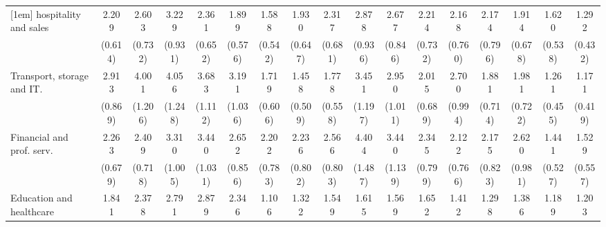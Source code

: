 {\begin{tabular}{l*{16}{c}}
[1em]
hospitality and sales&       2.209\sym{**} &       2.603\sym{***}&       3.229\sym{***}&       2.361\sym{**} &       1.899\sym{*}  &       1.588         &       1.930         &       2.317\sym{**} &       2.878\sym{**} &       2.677\sym{**} &       2.214\sym{*}  &       2.168\sym{*}  &       2.174\sym{*}  &       1.914         &       1.620         &       1.292         \\
                    &     (0.614)         &     (0.732)         &     (0.931)         &     (0.652)         &     (0.576)         &     (0.542)         &     (0.647)         &     (0.681)         &     (0.936)         &     (0.846)         &     (0.732)         &     (0.760)         &     (0.796)         &     (0.678)         &     (0.538)         &     (0.432)         \\
[1em]
Transport, storage and IT.&       2.913\sym{***}&       4.001\sym{***}&       4.056\sym{***}&       3.683\sym{***}&       3.191\sym{***}&       1.719         &       1.458         &       1.778         &       3.451\sym{***}&       2.950\sym{**} &       2.015\sym{*}  &       2.700\sym{**} &       1.881         &       1.981         &       1.261         &       1.171         \\
                    &     (0.869)         &     (1.206)         &     (1.248)         &     (1.112)         &     (1.036)         &     (0.606)         &     (0.509)         &     (0.558)         &     (1.197)         &     (1.011)         &     (0.689)         &     (0.994)         &     (0.714)         &     (0.722)         &     (0.455)         &     (0.419)         \\
[1em]
Financial and prof. serv.&       2.263\sym{**} &       2.409\sym{**} &       3.310\sym{***}&       3.440\sym{***}&       2.652\sym{**} &       2.202\sym{*}  &       2.236\sym{*}  &       2.566\sym{**} &       4.404\sym{***}&       3.440\sym{***}&       2.345\sym{*}  &       2.122\sym{*}  &       2.175\sym{*}  &       2.620\sym{*}  &       1.441         &       1.529         \\
                    &     (0.679)         &     (0.718)         &     (1.005)         &     (1.031)         &     (0.856)         &     (0.783)         &     (0.802)         &     (0.803)         &     (1.487)         &     (1.139)         &     (0.799)         &     (0.766)         &     (0.823)         &     (0.981)         &     (0.527)         &     (0.557)         \\
[1em]
Education and healthcare&       1.841         &       2.378\sym{**} &       2.791\sym{**} &       2.879\sym{**} &       2.346\sym{*}  &       1.106         &       1.322         &       1.549         &       1.615         &       1.569         &       1.652         &       1.412         &       1.298         &       1.386         &       1.189         &       1.203         \\

\end{tabular}}
